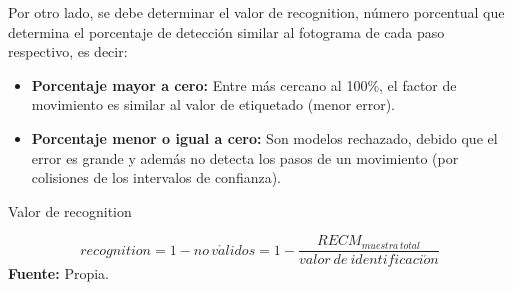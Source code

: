 Por otro lado, se debe determinar el valor de recognition, n\'umero porcentual que determina el porcentaje de detecci\'on similar al fotograma de cada paso respectivo, es decir:
 \begin{itemize}
\item \textbf{Porcentaje mayor a cero:} Entre m\'as cercano al 100\%, el factor de movimiento es similar al valor de etiquetado (menor error).
\item \textbf{Porcentaje menor o igual a cero:} Son modelos rechazado, debido que el error es grande y adem\'as no detecta los pasos de un movimiento (por colisiones de los intervalos de confianza).
\end{itemize}
\begin{formula}[H]
	\centering
	\caption{Valor de recognition}
	\label{frm:Recognitiona}
	\begin{equation}
recognition=1-no\,v\acute{a}lidos=1-\frac{RECM_{muestra\, total}}{valor\: de\: identificaci\acute{o}n}  
	\end{equation}
	\textbf{Fuente:} Propia.
\end{formula}
